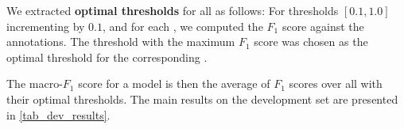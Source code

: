We extracted \textbf{optimal thresholds} for all \taxtypes{} as follows: For thresholds $[0.1, 1.0]$ incrementing by $0.1$, and for each \taxtype{}, we computed the $F_1$ score against the annotations. The threshold with the maximum $F_1$ score was chosen as the optimal threshold for the corresponding \taxtype.

The macro-$F_1$ score for a model is then the average of $F_1$ scores over all \taxtypes{} with their optimal thresholds. The main results on the development set are presented in \autoref{tab_dev_results}.


